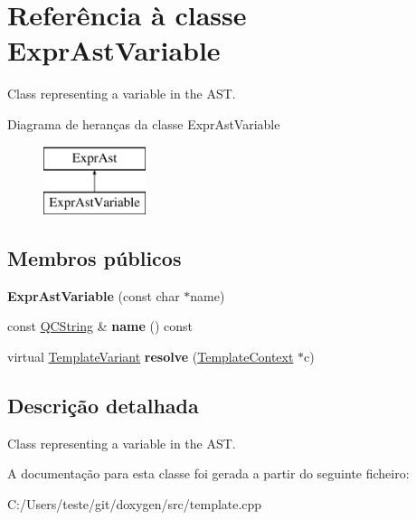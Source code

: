 \hypertarget{class_expr_ast_variable}{\section{Referência à classe Expr\-Ast\-Variable}
\label{class_expr_ast_variable}
}


Class representing a variable in the A\-S\-T.  


Diagrama de heranças da classe Expr\-Ast\-Variable\begin{figure}[H]
\begin{center}
\leavevmode
\includegraphics[height=2.000000cm]{class_expr_ast_variable}
\end{center}
\end{figure}
\subsection*{Membros públicos}
\begin{DoxyCompactItemize}
\item 
\hypertarget{class_expr_ast_variable_aaa9a090942773f5387bc6b0577c2ae76}{{\bfseries Expr\-Ast\-Variable} (const char $\ast$name)}\label{class_expr_ast_variable_aaa9a090942773f5387bc6b0577c2ae76}

\item 
\hypertarget{class_expr_ast_variable_a2c310e06c9aadc6fb218f80fcbb5c695}{const \hyperlink{class_q_c_string}{Q\-C\-String} \& {\bfseries name} () const }\label{class_expr_ast_variable_a2c310e06c9aadc6fb218f80fcbb5c695}

\item 
\hypertarget{class_expr_ast_variable_a19e3231655a2513f6467bc2b7cf1a9ed}{virtual \hyperlink{class_template_variant}{Template\-Variant} {\bfseries resolve} (\hyperlink{class_template_context}{Template\-Context} $\ast$c)}\label{class_expr_ast_variable_a19e3231655a2513f6467bc2b7cf1a9ed}

\end{DoxyCompactItemize}


\subsection{Descrição detalhada}
Class representing a variable in the A\-S\-T. 

A documentação para esta classe foi gerada a partir do seguinte ficheiro\-:\begin{DoxyCompactItemize}
\item 
C\-:/\-Users/teste/git/doxygen/src/template.\-cpp\end{DoxyCompactItemize}
